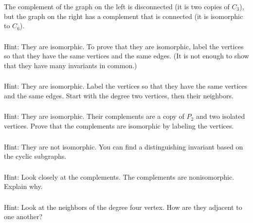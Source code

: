 \subsubsection*{ \answers}
    The complement of the graph on the left is disconnected (it is two copies of $C_3$), but the graph on the right has a complement that is connected (it is isomorphic to $C_6$).

\subsubsection*{ \answers}
    Hint: They are isomorphic.  To prove that they are isomorphic, label the vertices so that they have the same vertices and the same edges.  (It is not enough to show that they have many invariants in common.)

\subsubsection*{ \answers}
    Hint: They are isomorphic.  Label the vertices so that they have the same vertices and the same edges.  Start with the degree two vertices, then their neighbors.

\subsubsection*{ \answers}
    Hint: They are isomorphic. Their complements are a copy of $P_2$ and two isolated vertices.  Prove that the complements are isomorphic by labeling the vertices.

\subsubsection*{ \answers}
    Hint: They are not isomorphic.  You can find a distinguishing invariant based on the cyclic subgraphs.  

\subsubsection*{ \answers}
    Hint: Look closely at the complements.  The complements are nonisomorphic.  Explain why.

\subsubsection*{ \answers}
    Hint: Look at the neighbors of the degree four vertex.  How are they adjacent to one another?

